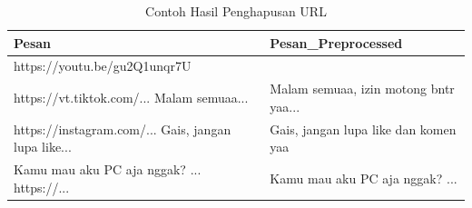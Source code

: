 \begingroup
\renewcommand{\arraystretch}{1}
\begin{table}[H]
\centering
\caption{Contoh Hasil Penghapusan URL}
\label{tab:remove-url}
\scriptsize
\begin{tabular}{p{5.5cm} p{5.5cm}}
\toprule
\textbf{Pesan} & \textbf{Pesan\_Preprocessed} \\
\midrule
https://youtu.be/gu2Q1unqr7U &  \\

https://vt.tiktok.com/... Malam semuaa... &
Malam semuaa, izin motong bntr yaa... \\

https://instagram.com/... Gais, jangan lupa like... &
Gais, jangan lupa like dan komen yaa \\

Kamu mau aku PC aja nggak? ... https://... &
Kamu mau aku PC aja nggak? ... \\
\bottomrule
\end{tabular}
\end{table}
\endgroup